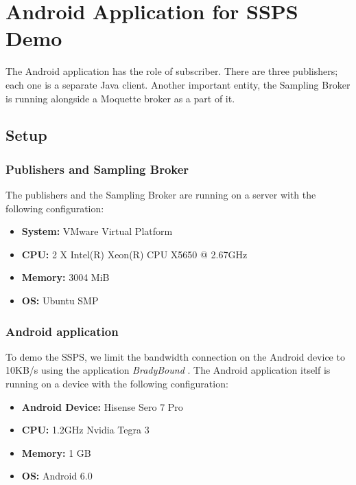 \section{Android Application for SSPS Demo} \label{android}

The Android application has the role of subscriber. There are three publishers; each one is a separate Java client. Another important entity, the Sampling Broker is running alongside a Moquette broker as a part of it.

\subsection{Setup}

\subsubsection{Publishers and Sampling Broker}

The publishers and the Sampling Broker are running on a server with the following configuration:

\begin{itemize}
    \item \textbf{System:} VMware Virtual Platform
    \item \textbf{CPU:} 2 X Intel(R) Xeon(R) CPU X5650  @ 2.67GHz
    \item \textbf{Memory:} 3004 MiB
    \item \textbf{OS:} Ubuntu SMP
\end{itemize}

\subsubsection{Android application}

To demo the SSPS, we limit the bandwidth connection on the Android device to 10KB/s using the application \textit{BradyBound} \parencite{brady}. The Android application itself is running on a device with the following configuration:

\begin{itemize}
    \item \textbf{Android Device:} Hisense Sero 7 Pro
    \item \textbf{CPU:} 1.2GHz Nvidia Tegra 3
    \item \textbf{Memory:} 1 GB
    \item \textbf{OS:} Android 6.0
\end{itemize}

